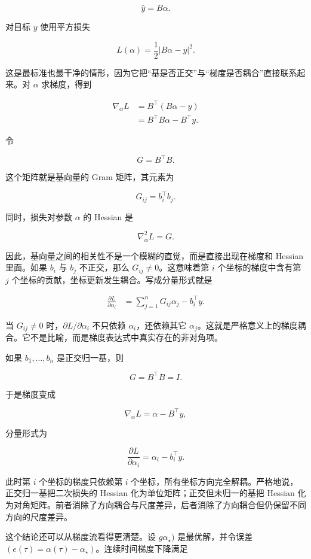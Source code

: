 \[
\hat y=B\alpha.
\]

对目标 \(y\) 使用平方损失

\[
L(\alpha)=\frac{1}{2}|B\alpha-y|^2.
\]

这是最标准也最干净的情形，因为它把“基是否正交”与“梯度是否耦合”直接联系起来。对 \(\alpha\) 求梯度，得到

\begin{align}
\nabla_\alpha L
&=B^\top(B\alpha-y) \\
&=B^\top B\alpha-B^\top y.
\end{align}

令

\[
G=B^\top B.
\]

这个矩阵就是基向量的 Gram 矩阵，其元素为

\[
G_{ij}=b_i^\top b_j.
\]

同时，损失对参数 \(\alpha\) 的 Hessian 是

\[
\nabla_\alpha^2 L=G.
\]

因此，基向量之间的相关性不是一个模糊的直觉，而是直接出现在梯度和 Hessian 里面。如果 \(b_i\) 与 \(b_j\) 不正交，那么 \(G_{ij}\neq 0\)。这意味着第 \(i\) 个坐标的梯度中含有第 \(j\) 个坐标的贡献，坐标更新发生耦合。写成分量形式就是

\begin{align}
\frac{\partial L}{\partial \alpha_i}
&=
\sum_{j=1}^n G_{ij}\alpha_j-b_i^\top y.
\end{align}

当 \(G_{ij}\neq 0\) 时，\(\partial L/\partial \alpha_i\) 不只依赖 \(\alpha_i\)，还依赖其它 \(\alpha_j\)。这就是严格意义上的梯度耦合。它不是比喻，而是梯度表达式中真实存在的非对角项。

如果 \(b_1,\ldots,b_n\) 是正交归一基，则

\[
G=B^\top B=I.
\]

于是梯度变成

\[
\nabla_\alpha L=\alpha-B^\top y,
\]

分量形式为

\[
\frac{\partial L}{\partial \alpha_i}
=\alpha_i-b_i^\top y.
\]

此时第 \(i\) 个坐标的梯度只依赖第 \(i\) 个坐标，所有坐标方向完全解耦。严格地说，正交归一基把二次损失的 Hessian 化为单位矩阵；正交但未归一的基把 Hessian 化为对角矩阵。前者消除了方向耦合与尺度差异，后者消除了方向耦合但仍保留不同方向的尺度差异。

这个结论还可以从梯度流看得更清楚。设 \(g\alpha_\star)\) 是最优解，并令误差 \((e(\tau)=\alpha(\tau)-\alpha_\star)\)。连续时间梯度下降满足

